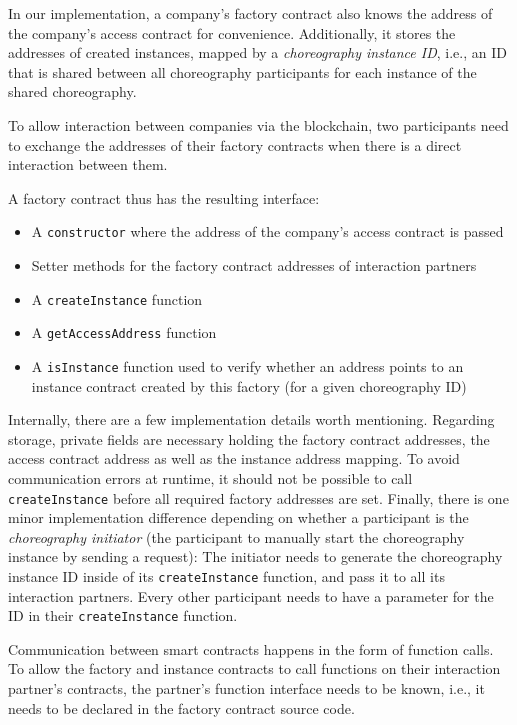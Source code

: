 \documentclass[runningheads]{llncs}
\begin{document}
In our implementation, a company's factory contract also knows the address of the company's access contract for convenience.
Additionally, it stores the addresses of created instances, mapped by a \emph{choreography instance ID}, i.e., an ID that is shared between all choreography participants for each instance of the shared choreography.

To allow interaction between companies via the blockchain, two participants need to exchange the addresses of their factory contracts when there is a direct interaction between them.

A factory contract thus has the resulting interface:
\begin{itemize}
	\item A \texttt{constructor} where the address of the company's access contract is passed
	\item Setter methods for the factory contract addresses of interaction partners
	\item A \texttt{createInstance} function
	\item A \texttt{getAccessAddress} function
	\item A \texttt{isInstance} function used to verify whether an address points to an instance contract created by this factory (for a given choreography ID)
\end{itemize}

Internally, there are a few implementation details worth mentioning.
Regarding storage, private fields are necessary holding the factory contract addresses, the access contract address as well as the instance address mapping.
To avoid communication errors at runtime, it should not be possible to call \texttt{createInstance} before all required factory addresses are set.
Finally, there is one minor implementation difference depending on whether a participant is the \emph{choreography initiator} (the participant to manually start the choreography instance by sending a request):
The initiator needs to generate the choreography instance ID inside of its \texttt{createInstance} function, and pass it to all its interaction partners.
Every other participant needs to have a parameter for the ID in their \texttt{createInstance} function.

Communication between smart contracts happens in the form of function calls.
To allow the factory and instance contracts to call functions on their interaction partner's contracts, the partner's function interface needs to be known, i.e., it needs to be declared in the factory contract source code.
\end{document}
